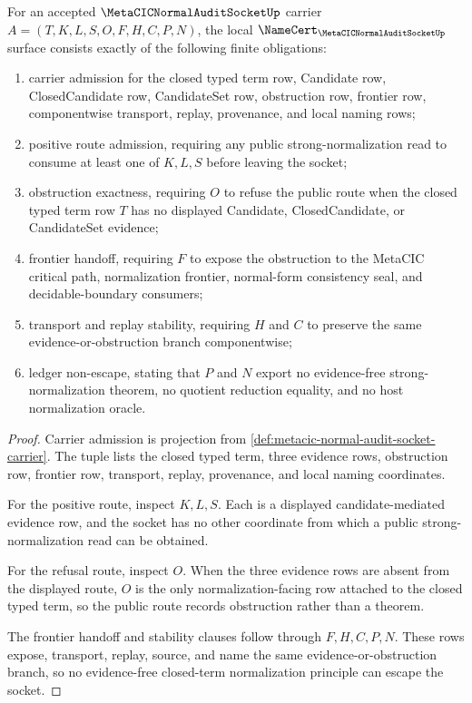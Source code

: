 \begin{theorem}
\label{thm:metacic-normal-audit-socket-namecert-obligations}
For an accepted $\MetaCICNormalAuditSocketUp$ carrier $A=(T,K,L,S,O,F,H,C,P,N)$, the local $\NameCert_{\MetaCICNormalAuditSocketUp}$ surface consists exactly of the following finite obligations:
\begin{enumerate}
\item carrier admission for the closed typed term row, Candidate row, ClosedCandidate row, CandidateSet row, obstruction row, frontier row, componentwise transport, replay, provenance, and local naming rows;
\item positive route admission, requiring any public strong-normalization read to consume at least one of $K,L,S$ before leaving the socket;
\item obstruction exactness, requiring $O$ to refuse the public route when the closed typed term row $T$ has no displayed Candidate, ClosedCandidate, or CandidateSet evidence;
\item frontier handoff, requiring $F$ to expose the obstruction to the MetaCIC critical path, normalization frontier, normal-form consistency seal, and decidable-boundary consumers;
\item transport and replay stability, requiring $H$ and $C$ to preserve the same evidence-or-obstruction branch componentwise;
\item ledger non-escape, stating that $P$ and $N$ export no evidence-free strong-normalization theorem, no quotient reduction equality, and no host normalization oracle.
\end{enumerate}
\end{theorem}
\begin{proof}
Carrier admission is projection from \autoref{def:metacic-normal-audit-socket-carrier}. The tuple lists the closed typed term, three evidence rows, obstruction row, frontier row, transport, replay, provenance, and local naming coordinates.

For the positive route, inspect $K,L,S$. Each is a displayed candidate-mediated evidence row, and the socket has no other coordinate from which a public strong-normalization read can be obtained.

For the refusal route, inspect $O$. When the three evidence rows are absent from the displayed route, $O$ is the only normalization-facing row attached to the closed typed term, so the public route records obstruction rather than a theorem.

The frontier handoff and stability clauses follow through $F,H,C,P,N$. These rows expose, transport, replay, source, and name the same evidence-or-obstruction branch, so no evidence-free closed-term normalization principle can escape the socket.
\end{proof}

